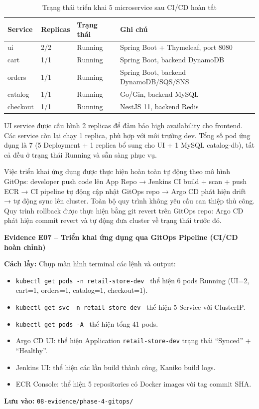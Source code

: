 \documentclass[13pt,a4paper,twoside]{extarticle}
\newcommand{\evidence}[1]{%
  \begin{evidencebox}
  #1
  \end{evidencebox}
}
\begin{document}
\begin{table}[H]
\centering
\begin{tabular}{@{}p{3cm} p{3cm} p{2.5cm} p{6cm}@{}}
\toprule
\textbf{Service} & \textbf{Replicas} & \textbf{Trạng thái} & \textbf{Ghi chú} \\
\midrule
ui & 2/2 & Running & Spring Boot + Thymeleaf, port 8080 \\
cart & 1/1 & Running & Spring Boot, backend DynamoDB \\
orders & 1/1 & Running & Spring Boot, backend DynamoDB/SQS/SNS \\
catalog & 1/1 & Running & Go/Gin, backend MySQL \\
checkout & 1/1 & Running & NestJS 11, backend Redis \\
\bottomrule
\end{tabular}
\caption{Trạng thái triển khai 5 microservice sau CI/CD hoàn tất}
\label{tab:app-deploy}
\end{table}

UI service được cấu hình 2 replicas để đảm bảo high availability cho frontend. Các service còn lại chạy 1 replica, phù hợp với môi trường dev. Tổng số pod ứng dụng là 7 (5 Deployment + 1 replica bổ sung cho UI + 1 MySQL catalog-db), tất cả đều ở trạng thái Running và sẵn sàng phục vụ.

Việc triển khai ứng dụng được thực hiện hoàn toàn tự động theo mô hình GitOps: developer push code lên App Repo → Jenkins CI build + scan + push ECR → CI pipeline tự động cập nhật GitOps repo → Argo CD phát hiện drift → tự động sync lên cluster. Toàn bộ quy trình không yêu cầu can thiệp thủ công. Quy trình rollback được thực hiện bằng git revert trên GitOps repo: Argo CD phát hiện commit revert và tự động đưa cluster về trạng thái trước đó.

\evidence{
\textbf{Evidence E07 -- Triển khai ứng dụng qua GitOps Pipeline (CI/CD hoàn chỉnh)}

\smallskip
\textbf{Cách lấy:} Chụp màn hình terminal các lệnh và output:
\begin{itemize}[leftmargin=*,nosep]
  \item \texttt{kubectl get pods -n retail-store-dev} \textrightarrow\ thể hiện 6 pods Running (UI=2, cart=1, orders=1, catalog=1, checkout=1).
  \item \texttt{kubectl get svc -n retail-store-dev} \textrightarrow\ thể hiện 5 Service với ClusterIP.
  \item \texttt{kubectl get pods -A} \textrightarrow\ thể hiện tổng 41 pods.
  \item Argo CD UI: thể hiện Application \texttt{retail-store-dev} trạng thái ``Synced'' + ``Healthy''.
  \item Jenkins UI: thể hiện các lần build thành công, Kaniko build logs.
  \item ECR Console: thể hiện 5 repositories có Docker images với tag commit SHA.
\end{itemize}
\textbf{Lưu vào:} \texttt{08-evidence/phase-4-gitops/}
}
\end{document}
